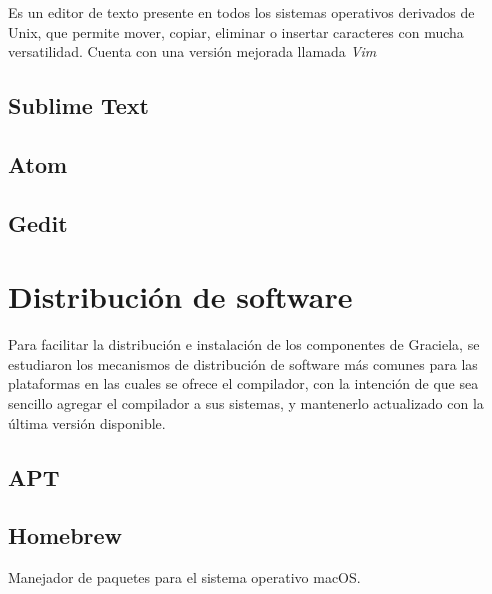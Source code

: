 Es un editor de texto presente en todos los sistemas operativos derivados de
Unix, que  permite mover, copiar, eliminar o insertar caracteres con mucha
versatilidad. Cuenta con una versión mejorada llamada \textit{Vim}

\subsection{Sublime Text}

\subsection{Atom}

\subsection{Gedit}

\section{Distribución de software}

Para facilitar la distribución e instalación de los componentes de Graciela, se
estudiaron los mecanismos de distribución de software más comunes para las
plataformas en las cuales se ofrece el compilador, con la intención de que sea
sencillo agregar el compilador a sus sistemas, y mantenerlo actualizado con la
última versión disponible.

\subsection{APT}

\subsection{Homebrew}

Manejador de paquetes para el sistema operativo macOS.
